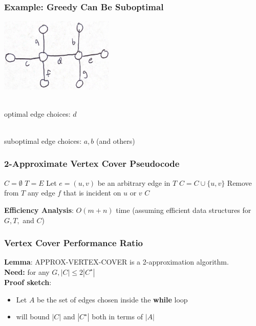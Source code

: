 \documentclass{beamer}
\newcommand{\stanza}{ \\~\ }
\begin{document}
\begin{frame} \frametitle{Example: Greedy Can Be Suboptimal}
\begin{center}
  \includegraphics[height=100pt]{vertex-cover-counterexample.png}
  \stanza
  
  optimal edge choices: $d$ \stanza

  suboptimal edge choices: $a, b$ (and others)

\end{center}
\end{frame}
  
\begin{frame} \frametitle{2-Approximate Vertex Cover Pseudocode}
  \begin{algorithmic}[1]
      \State $C=\emptyset$
      \State $T=E$ 
        \State Let $e=(u, v)$ be an arbitrary edge in $T$
        \State $C = C \cup \{u, v \}$
        \State Remove from $T$ any edge $f$ that is incident on $u$ or $v$
      \EndWhile
      \State \Return $C$
    \EndFunction
  \end{algorithmic}
\vspace{.5cm}
\textbf{Efficiency Analysis}: $O(m+n)$ time (assuming efficient data structures
for $G, T,$ and $C$)
\end{frame}

\begin{frame} \frametitle{Vertex Cover Performance Ratio}
\textbf{Lemma}: APPROX-VERTEX-COVER is a 2-approximation algorithm. \\
\textbf{Need:} for any $G, |C| \leq 2 |C^\star|$ \\
\textbf{Proof sketch}:
\begin{itemize}
  \item Let $A$ be the set of edges chosen inside the \textbf{while} loop
  \item will bound $|C|$ and $|C^\star|$ both in terms of $|A|$
\end{itemize}
\end{frame}
  
\end{document}
